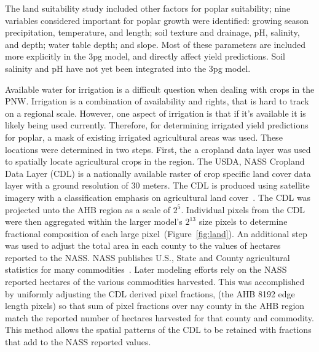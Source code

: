 \documentclass[preprint,12pt]{elsarticle}
\begin{document}
The land suitability study included other factors for poplar
suitability; nine variables considered important for poplar growth
were identified: growing season precipitation, temperature, and
length; soil texture and drainage, pH, salinity, and depth; water
table depth; and slope.  Most of these parameters are included more
explicitly in the \ac{3pg} model, and directly affect yield
predictions.  Soil salinity and pH have not yet been integrated into
the \ac{3pg} model.


Available water for irrigation is a difficult question when dealing
with crops in the \ac{PNW}.  Irrigation is a combination of
availability and rights, that is hard to track on a regional scale.
However, one aspect of irrigation is that if it's available it is
likely being used currently.  Therefore, for determining irrigated
yield predictions for poplar, a mask of existing irrigated
agricultural areas was used.  These locations were determined in two
steps.  First, the a cropland data layer was used to spatially locate
agricultural crops in the region.  The USDA, NASS Cropland Data Layer
(CDL) is a nationally available raster of crop specific land cover
data layer with a ground resolution of 30 meters.  The CDL is produced
using satellite imagery with a classification emphasis on agricultural
land cover~\cite{cdl2011}.  The CDL was projected unto the \ac{AHB}
region as a scale of $2^5$.  Individual pixels from the CDL were then
aggregated within the larger model's $2^{13}$ size pixels to determine
fractional composition of each large pixel~(Figure~\ref{fig:land}).  An
additional step was used to adjust the total area in each county to
the values of hectares reported to the \ac{NASS}.  \ac{NASS} publishes
U.S., State and County agricultural statistics for many
commodities~\cite{nass-quick-stats}.  Later modeling efforts rely on
the \ac{NASS} reported hectares of the various commodities harvested.
This was accomplished by uniformly adjusting the CDL derived pixel
fractions, (the \ac{AHB} 8192 edge length pixels) so that sum of pixel
fractions over nay county in the \ac{AHB} region match the reported
number of hectares harvested for that county and commodity.  This
method allows the spatial patterns of the CDL to be retained with
fractions that add to the \ac{NASS} reported values.
\end{document}
